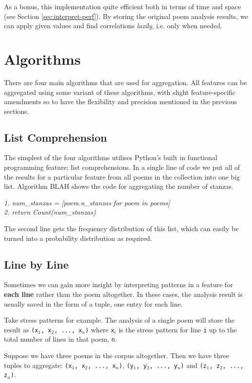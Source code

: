 As a bonus, this implementation quite efficient both in terms of time and space (see Section \ref{sec:interpret-perf}). By storing the original poem analysis results, we can apply given values and find correlations \textit{lazily}, i.e. only when needed.


\section{Algorithms}

There are four main algorithms that are used for aggregation. All features can be aggregated using some variant of these algorithms, with slight feature-specific amendments so to have the flexibility and precision mentioned in the previous sections.

\subsection{List Comprehension}
\label{sec:listcomp}

The simplest of the four algorithms utilises Python's built in functional programming feature; list comprehensions. In a single line of code we put all of the results for a particular feature from all poems in the collection into one big list. Algorithm BLAH shows the code for aggregating the number of stanzas.

\textit{
1. num\_stanzas = [poem.n\_stanzas for poem in poems]\\
2. return Count(num\_stanzas)
}

The second line gets the frequency distribution of this list, which can easily be turned into a probability distribution as required.


\subsection{Line by Line}

Sometimes we can gain more insight by interpreting patterns in a feature for \textbf{each line} rather than the poem altogether. In these cases, the analysis result is usually saved in the form of a tuple, one entry for each line.

Take stress patterns for example. The analysis of a single poem will store the result as \texttt{(x$_1$, x$_2$, ..., x$_n$)} where \texttt{x$_i$} is the stress pattern for line \texttt{i} up to the total number of lines in that poem, \texttt{n}.

Suppose we have three poems in the corpus altogether. Then we have three tuples to aggregate: \texttt{(x$_1$, x$_2$, ..., x$_n$)}, \texttt{(y$_1$, y$_2$, ..., y$_n$)} and \texttt{(z$_1$, z$_2$, ..., z$_n$)}. 

